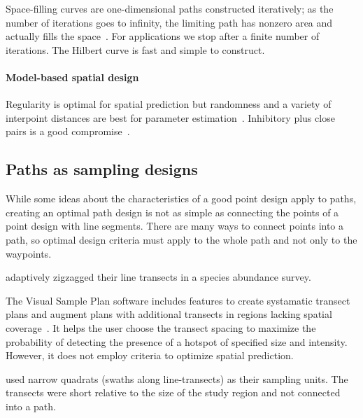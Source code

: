 \documentclass[review]{elsarticle}
\begin{document}
Space-filling curves are one-dimensional paths constructed iteratively; as the
number of iterations goes to infinity, the limiting path has nonzero area and
actually fills the space~\citep{sagan}. For applications we stop after a finite
number of iterations. The Hilbert curve is fast and simple to construct.

\paragraph{Model-based spatial design}
Regularity is optimal for spatial prediction but randomness and a variety of
interpoint distances are best for parameter estimation~\citep{diggle}.
Inhibitory plus close pairs is a good compromise~\citep{chipetaetal2017}.


\subsection{Paths as sampling designs}

While some ideas about the characteristics of a good point design apply to
paths, creating an optimal path design is not as simple as connecting the
points of a point design with line segments. There are many ways to connect
points into a path, so optimal design criteria must apply to the whole path and
not only to the waypoints.

\citet{pollard} adaptively zigzagged their line transects in a species
abundance survey.

The Visual Sample Plan software includes features to create systamatic transect
plans and augment plans with additional transects in regions lacking spatial
coverage~\citep{vspguide}. It helps the user choose the transect spacing to
maximize the probability of detecting the presence of a hotspot of specified
size and intensity. However, it does not employ criteria to optimize spatial
prediction.

\citet{liuvanhatalo} used narrow quadrats (swaths along line-transects) as
their sampling units. The transects were short relative to the size of the
study region and not connected into a path.




\end{document}

